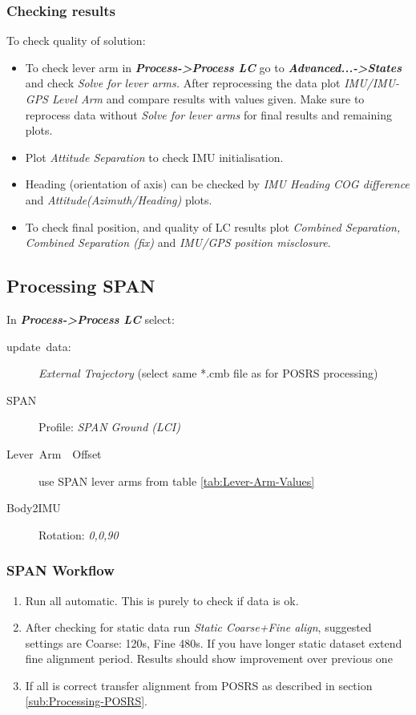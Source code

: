 \documentclass[british,DIV=calc, paper=a4, fontsize=12pt, onecolumn]{scrartcl}
\begin{document}
\subsubsection{Checking results}

To check quality of solution:
\begin{itemize}
	\item To check lever arm in \textbf{\emph{Process->Process LC}} go to \textbf{\emph{Advanced...->States }}and check\emph{ Solve for lever arms. }After reprocessing the data plot\emph{ IMU/IMU-GPS Level Arm} and compare results with values given. Make sure to reprocess data without \emph{Solve for lever arms }for final results and remaining plots.
	\item Plot \emph{Attitude Separation} to check IMU initialisation.
	\item Heading (orientation of axis) can be checked by \emph{IMU Heading COG difference} and \emph{Attitude(Azimuth/Heading)} plots.
	\item To check final position, and quality of LC results plot \emph{Combined Separation, Combined Separation (fix)} and\emph{ IMU/GPS position misclosure}. 
\end{itemize}

\subsection{Processing SPAN}\label{sub:Processing-SPAN}

In \textbf{\emph{Process->Process LC}} select:
\begin{description}
	\item [{update~data:}] \emph{External Trajectory }(select same {*}.cmb
	file as for POSRS processing)
	\item [{SPAN}] Profile: \emph{SPAN Ground (LCI) }
	\item [{Lever~Arm~~Offset}] use SPAN lever arms from table \ref{tab:Lever-Arm-Values}
	\item [{Body2IMU}] Rotation: \emph{0,0,90}
\end{description}

\subsubsection{SPAN Workflow\label{sub:SPAN-Workflow}}

\begin{enumerate}
\item Run all automatic. This is purely to check if data is ok.
\item After checking for static data run \emph{Static Coarse+Fine align}, suggested settings are Coarse: 120s, Fine 480s. If you have longer static dataset extend fine alignment period. Results should show improvement over previous one
\item If all is correct transfer alignment from POSRS as described in section \ref{sub:Processing-POSRS}.
\end{enumerate}
\end{document}

